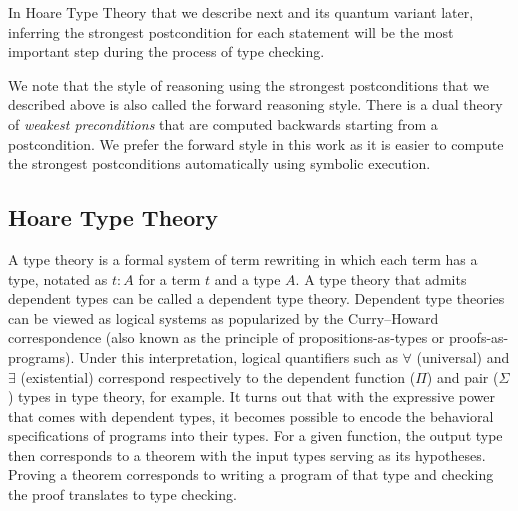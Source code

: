 In Hoare Type Theory that we describe next and its quantum variant later, inferring the strongest postcondition for each statement will be the most important step during the process of type checking.

We note that the style of reasoning using the strongest postconditions that we described above is also called the forward reasoning style. There is a dual theory of \textit{weakest preconditions} that are computed backwards starting from a postcondition. We prefer the forward style in this work as it is easier to compute the strongest postconditions automatically using symbolic execution.

\subsection{Hoare Type Theory}

A type theory is a formal system of term rewriting in which each term has a type, notated as $t:A$ for a term $t$ and a type $A$. A type theory that admits dependent types can be called a dependent type theory. Dependent type theories can be viewed as logical systems as popularized by the Curry--Howard correspondence (also known as the principle of propositions-as-types or proofs-as-programs). Under this interpretation, logical quantifiers such as $\forall$ (universal) and $\exists$ (existential) correspond respectively to the dependent function ($\Pi$) and pair ($\Sigma$) types in type theory, for example. It turns out that with the expressive power that comes with dependent types, it becomes possible to encode the behavioral specifications of programs into their types. For a given function, the output type then corresponds to a theorem with the input types serving as its hypotheses. Proving a theorem corresponds to writing a program of that type and checking the proof translates to type checking.

